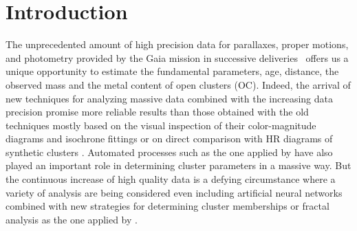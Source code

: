 \documentclass{aa}
\begin{document}

\maketitle


\section{Introduction}

 The unprecedented amount of high precision data for parallaxes, proper motions,
 and photometry provided by the Gaia mission in successive
 deliveries~\citep[DR2 and EDR3,][]{Gaia_2016,Gaia_EDR3} offers us a unique
 opportunity to estimate the fundamental parameters, age, distance, the observed
 mass and the metal content of open clusters (OC).
 Indeed, the arrival of new techniques for
 analyzing massive data combined with the increasing data precision promise
 more reliable results than those obtained with the old techniques mostly
 based on the visual inspection of their color-magnitude diagrams and
 isochrone fittings \citep{Phelps1994} or on direct comparison with HR diagrams
 of synthetic clusters \citep{Siess1997}. Automated processes such as the one
 applied by \cite{Kharchenko_2012} have also played an important role in
 determining cluster parameters in a massive way. But the continuous increase
 of high quality data is a defying circumstance where a variety of analysis are
 being considered even including artificial neural networks
 \citep{Cantat_2020} combined with new strategies for determining cluster
 memberships \citep{Krone2014,Cantat2018} or fractal analysis as the one applied
 by \citep{Gregorio_2015}.
\end{document}
